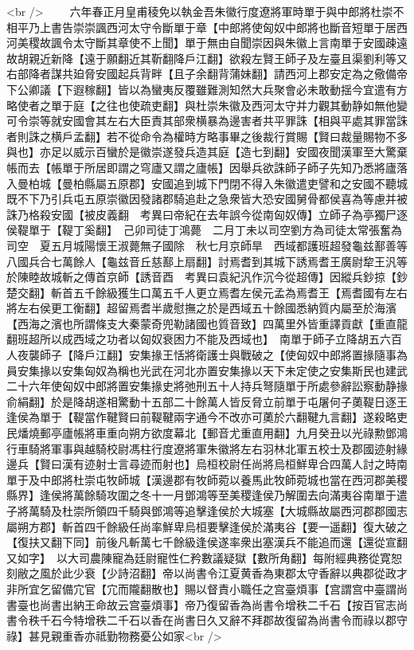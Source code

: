 <br />
　　六年春正月皇甫稜免以執金吾朱徽行度遼將軍時單于與中郎將杜崇不相平乃上書告崇崇諷西河太守令斷單于章【中郎將使匈奴中郎將也斷音短單于居西河美稷故諷令太守斷其章使不上聞】單于無由自聞崇因與朱徽上言南單于安國疎遠故胡親近新降【遠于願翻近其靳翻降戶江翻】欲殺左賢王師子及左臺且渠劉利等又右部降者謀共廹脅安國起兵背畔【且子余翻背蒲妹翻】請西河上郡安定為之儆備帝下公卿議【下遐稼翻】皆以為蠻夷反覆雖難測知然大兵聚會必未敢動揺今宜遣有方略使者之單于庭【之往也使疏吏翻】與杜崇朱徽及西河太守并力觀其動静如無他變可令崇等就安國會其左右大臣責其部衆横暴為邊害者共平罪誅【相與平處其罪當誅者則誅之横戶孟翻】若不從命令為權時方略事畢之後裁行賞賜【賢曰裁量賜物不多與也】亦足以威示百蠻於是徽崇遂發兵造其庭【造七到翻】安國夜聞漢軍至大驚棄帳而去【帳單于所居即謂之穹廬又謂之廬帳】因舉兵欲誅師子師子先知乃悉將廬落入曼柏城【曼柏縣屬五原郡】安國追到城下門閉不得入朱徽遣吏譬和之安國不聽城既不下乃引兵屯五原崇徽因發諸郡騎追赴之急衆皆大恐安國舅骨都侯喜為等慮并被誅乃格殺安國【被皮義翻　考異曰帝紀在去年誤今從南匈奴傳】立師子為亭獨尸逐侯鞮單于【鞮丁奚翻】　己卯司徒丁鴻薨　二月丁未以司空劉方為司徒太常張奮為司空　夏五月城陽懷王淑薨無子國除　秋七月京師旱　西域都護班超發龜兹鄯善等八國兵合七萬餘人【龜兹音丘慈鄯上扇翻】討焉耆到其城下誘焉耆王廣尉犂王汎等於陳睦故城斬之傳首京師【誘音酉　考異曰袁紀汎作沉今從超傳】因縱兵鈔掠【鈔楚交翻】斬首五千餘級獲生口萬五千人更立焉耆左侯元孟為焉耆王【焉耆國有左右將左右侯更工衡翻】超留焉耆半歲慰撫之於是西域五十餘國悉納質内屬至於海濱【西海之濱也所謂條支大秦蒙奇兜勒諸國也質音致】四萬里外皆重譯貢獻【重直龍翻班超所以成西域之功者以匈奴衰困力不能及西域也】　南單于師子立降胡五六百人夜襲師子【降戶江翻】安集掾王恬將衛護士與戰破之【使匈奴中郎將置掾隨事為員安集掾以安集匈奴為稱也光武在河北亦置安集掾以天下未定使之安集斯民也建武二十六年使匈奴中郎將置安集掾史將弛刑五十人持兵弩隨單于所處參辭訟察動静掾俞絹翻】於是降胡遂相驚動十五部二十餘萬人皆反脅立前單于屯屠何子薁鞮日逐王逢侯為單于【鞮當作鞬賢曰前鞮鞬兩字通今不改亦可薁於六翻鞬九言翻】遂殺略吏民燔燒郵亭廬帳將車重向朔方欲度幕北【郵音尤重直用翻】九月癸丑以光祿勲鄧鴻行車騎將軍事與越騎校尉馮柱行度遼將軍朱徽將左右羽林北軍五校士及郡國迹射緣邊兵【賢曰漢有迹射士言尋迹而射也】烏桓校尉任尚將烏桓鮮卑合四萬人討之時南單于及中郎將杜崇屯牧師城【漢邊郡有牧師菀以養馬此牧師菀城也當在西河郡美稷縣界】逢侯將萬餘騎攻圍之冬十一月鄧鴻等至美稷逢侯乃解圍去向滿夷谷南單于遣子將萬騎及杜崇所領四千騎與鄧鴻等追擊逢侯於大城塞【大城縣故屬西河郡郡國志屬朔方郡】斬首四千餘級任尚率鮮卑烏桓要擊逢侯於滿夷谷【要一遥翻】復大破之【復扶又翻下同】前後凡斬萬七千餘級逢侯遂率衆出塞漢兵不能追而還【還從宣翻又如字】　以大司農陳寵為廷尉寵性仁矜數議疑獄【數所角翻】每附經典務從寛恕刻敝之風於此少衰【少詩沼翻】帝以尚書令江夏黄香為東郡太守香辭以典郡從政才非所宜乞留備宂官【宂而隴翻散也】賜以督責小職任之宫臺煩事【宫謂宫中臺謂尚書臺也尚書出納王命故云宫臺煩事】帝乃復留香為尚書令增秩二千石【按百官志尚書令秩千石今特增秩二千石以香在尚書日久又辭不拜郡故復留為尚書令而祿以郡守祿】甚見親重香亦祗勤物務憂公如家<br />
